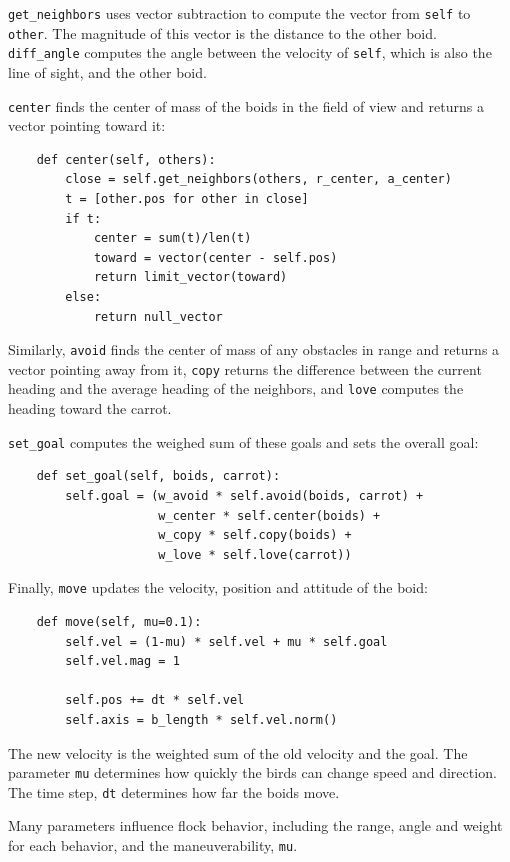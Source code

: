\documentclass[10pt]{book}
\begin{document}
\verb"get_neighbors" uses vector subtraction to compute the
vector from {\tt self} to {\tt other}.  The magnitude of
this vector is the distance to the other boid.  \verb"diff_angle"
computes the angle between the velocity of {\tt self}, which
is also the line of sight, and the other boid.

{\tt center} finds the center of mass of the boids in the
field of view and returns a vector pointing toward it:

\begin{verbatim}
    def center(self, others):
        close = self.get_neighbors(others, r_center, a_center)
        t = [other.pos for other in close]
        if t:
            center = sum(t)/len(t)
            toward = vector(center - self.pos)
            return limit_vector(toward)
        else:
            return null_vector
\end{verbatim}

Similarly, {\tt avoid} finds the center of mass of any obstacles
in range and returns a vector pointing away from it,
{\tt copy} returns the difference between the current heading
and the average heading of the neighbors, and {\tt love}
computes the heading toward the carrot.

\verb"set_goal" computes the weighed sum of these goals and
sets the overall goal:

\begin{verbatim}
    def set_goal(self, boids, carrot):
        self.goal = (w_avoid * self.avoid(boids, carrot) + 
                     w_center * self.center(boids) +
                     w_copy * self.copy(boids) + 
                     w_love * self.love(carrot))
\end{verbatim}

Finally, {\tt move} updates the velocity, position and
attitude of the boid:

\begin{verbatim}
    def move(self, mu=0.1):
        self.vel = (1-mu) * self.vel + mu * self.goal
        self.vel.mag = 1

        self.pos += dt * self.vel
        self.axis = b_length * self.vel.norm()
\end{verbatim}

The new velocity is the weighted sum of the old velocity
and the goal.  The parameter {\tt mu} determines how quickly
the birds can change speed and direction.  The time step, {\tt dt}
determines how far the boids move.

Many parameters influence flock behavior, including the range, angle
and weight for each behavior, and the maneuverability, {\tt mu}.
\end{document}
